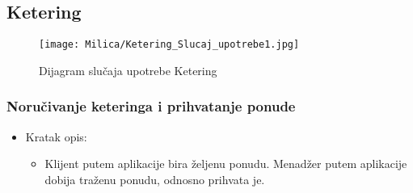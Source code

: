 \documentclass[a4paper]{article}
\begin{document}

\subsection{Ketering}

  
\begin{figure}[H]
\centering
\texttt{[image: Milica/Ketering\_Slucaj\_upotrebe1.jpg]}
\caption{Dijagram slučaja upotrebe Ketering}
\label{fig:Ketering}
\end{figure}

\subsubsection{Noručivanje keteringa i prihvatanje ponude}
\begin{itemize}
    \item Kratak opis:
    \begin{itemize}
 
        \item Klijent putem aplikacije bira željenu ponudu. Menadžer putem aplikacije dobija traženu ponudu, odnosno prihvata je.
    \end{itemize}
    
    
\end{itemize}
\end{document}
